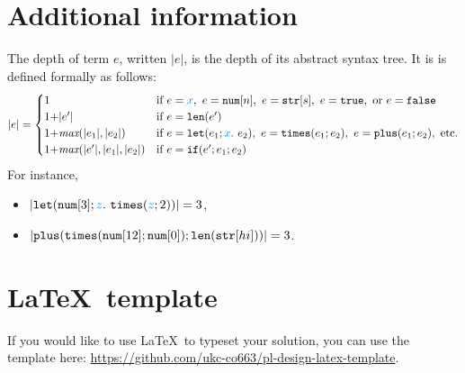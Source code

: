\documentclass[11pt]{article}
\begin{document}
\section{Additional information}
The depth of term $e$, written $\lvert e \rvert$, is the depth of its
abstract syntax tree.
% 
It is is defined formally as follows:
% 
\[
\lvert e \rvert =
\begin{cases}
  1 & \text{if } e = \var{x}, \ e = \enum{n}, \ e = \estr{s}, \ e = \ktrue, \ \text{or } e = \kfalse
  \\
  1 {+}  \lvert e' \rvert  & \text{if } e = \elen{e'}
  \\
  1   {+} \textit{max}(\lvert e_1 \rvert, \lvert e_2 \rvert)  & \text{if }  e = \elet{e_1}{x}{e_2}, \ e = \etimes{e_1}{e_2}, \  e = \eplus{e_1}{e_2}, \ \text{etc.}
  \\
  1   {+} \textit{max}(\lvert e' \rvert, \lvert e_1 \rvert, \lvert e_2 \rvert)  & \text{if } e = \site{e'}{e_1}{e_2}
\end{cases}
\]
For instance,
\begin{itemize}
\item $\lvert \elet{\enum{3}}{{z}}{\etimes{\var{z}}{2}} \rvert = 3$, 
\item $\lvert \eplus{\etimes{\enum{12}}{\enum{0}}}{\elen{\estr{hi}}} \rvert = 3$.
\end{itemize}

\section*{\LaTeX\ template}

If you would like to use \LaTeX\ to typeset your solution, you can use
the template here:
\url{https://github.com/ukc-co663/pl-design-latex-template}.
\end{document}
